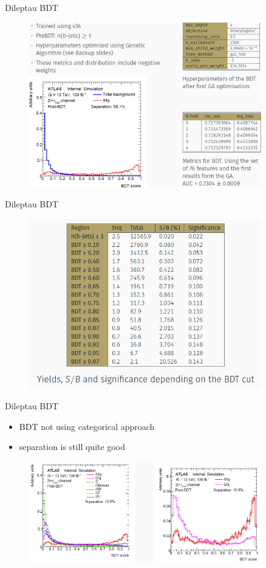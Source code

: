 \begin{frame}{Dileptau BDT}
    \begin{figure}
        \centering
        \includegraphics[width=0.9\textwidth]{BDT1}
    \end{figure}
\end{frame}

\begin{frame}{Dileptau BDT}
    \begin{figure}
        \centering
        \includegraphics[width=0.9\textwidth]{BDT2}
    \end{figure}
\end{frame}

\begin{frame}{Dileptau BDT}
    \begin{itemize}
        \item BDT not using categorical approach
        \item \tZq separation is still quite good
    \end{itemize}
    \begin{figure}
        \centering
        \includegraphics[width=0.9\textwidth]{BDT3}
    \end{figure}
\end{frame}
